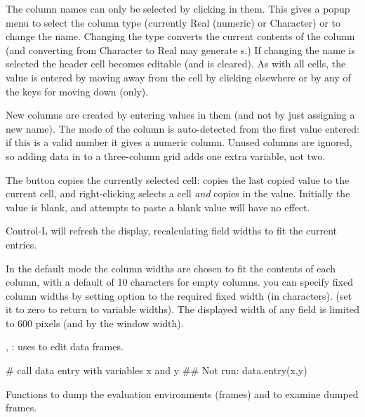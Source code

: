 \begin{Note}
The column names can only be selected by clicking in them.  This gives
a popup menu to select the column type (currently Real (numeric) or
Character) or to change the name.  Changing the type converts the
current contents of the column (and converting from Character to Real
may generate s.)
If changing the name is selected the
header cell becomes editable (and is cleared).  As with all cells, the
value is entered by moving away from the cell by clicking elsewhere or
by any of the keys for moving down (only).

New columns are created by entering values in them (and not by just
assigning a new name).  The mode of the column is auto-detected from
the first value entered: if this is a valid number it gives a numeric
column.  Unused columns are ignored, so
adding data in  to a three-column grid adds one extra
variable, not two.

The  button copies the currently selected cell:
 copies the last copied value to the current cell, and
right-clicking selects a cell \emph{and} copies in the value.
Initially the value is blank, and attempts to paste a blank value will
have no effect.

Control-L will refresh the display, recalculating field widths to fit
the current entries.

In the default mode the column widths are chosen to fit the contents
of each column, with a default of 10 characters for empty columns.
you can specify fixed column widths by setting option
 to the required fixed width (in characters).
(set it to zero to return to variable widths).  The displayed
width of any field is limited to
600 pixels (and by the window width).
\end{Note}
%
\begin{SeeAlso}\relax
{}, :  uses
 to edit data frames.
\end{SeeAlso}
%
\begin{Examples}
\begin{ExampleCode}
# call data entry with variables x and y
## Not run: data.entry(x,y)
\end{ExampleCode}
\end{Examples}
%
\begin{Description}\relax
Functions to dump the evaluation environments (frames) and to examine
dumped frames.
\end{Description}
